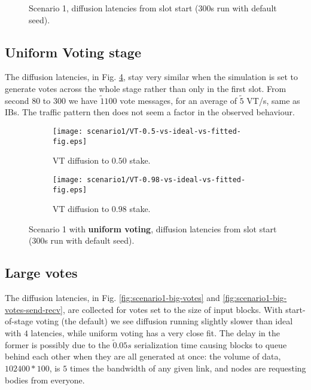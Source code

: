 \documentclass[11pt,a4paper]{article}
\begin{document}
\begin{figure}[htbp]
    \caption{Scenario 1, diffusion latencies from slot start (300s run with default seed).}
    \label{fig:scenario1}
\end{figure}

\subsection{Uniform Voting stage}
The diffusion latencies, in Fig. \ref{fig:scenario1-send-recv}, stay very
similar when the simulation is set to generate votes across the whole stage
rather than only in the first slot.
From second $80$ to $300$ we have $\tilde1100$ vote messages, for an average of $\tilde5$
VT/s, same as IBs. The traffic pattern then does not seem a factor in the observed behaviour.
\begin{figure}[htbp]
    \centering
    \begin{subfigure}[b]{0.45\textwidth}
        \centering
        \texttt{[image: scenario1/VT-0.5-vs-ideal-vs-fitted-fig.eps]}
        \caption{VT diffusion to $0.50$ stake.}
        \label{scenario1-send-recv:vt0.5}
    \end{subfigure}
    \hfill
    \begin{subfigure}[b]{0.45\textwidth}
        \centering
        \texttt{[image: scenario1/VT-0.98-vs-ideal-vs-fitted-fig.eps]}
        \caption{VT diffusion to $0.98$ stake.}
        \label{scenario1-send-recv:vt0.98}
    \end{subfigure}
    \caption{Scenario 1 with \textbf{uniform voting}, diffusion latencies from slot start (300s run with default seed).}
    \label{fig:scenario1-send-recv}
\end{figure}

\subsection{Large votes}
The diffusion latencies, in Fig. \ref{fig:scenario1-big-votes} and
\ref{fig:scenario1-big-votes-send-recv}, are collected for votes set to the size
of input blocks. With start-of-stage voting (the default) we see diffusion running
slightly slower than ideal with $4$ latencies, while uniform voting has a very
close fit. The delay in the former is possibly due to the $\tilde0.05s$
serialization time causing blocks to queue behind each other when they are all
generated at once: the volume of data, $102400*100$, is $5$ times the bandwidth
of any given link, and nodes are requesting bodies from everyone.
\end{document}
